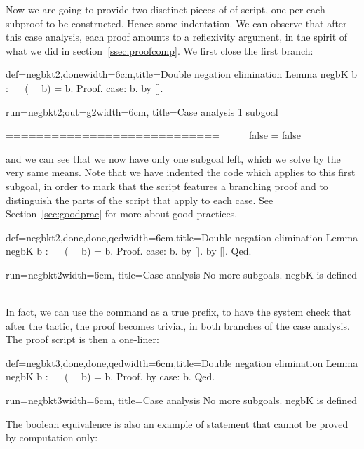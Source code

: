 Now we are going to provide two disctinct pieces of of script, one per
each subproof to be constructed. Hence some indentation. We can
observe that after this case analysis, each proof amounts to a
reflexivity argument, in the spirit of what we did in
section~\ref{ssec:proofcomp}. We first close the first branch:

\begin{coq}{def=negbkt2,done}{width=6cm,title=Double negation elimination}
Lemma negbK b : ~~ (~~ b) = b.
Proof.
case: b.
  by [].
\end{coq}
\begin{coqout}{run=negbkt2;out=g2}{width=6cm, title=Case analysis}
1 subgoal

 ============================
   ~~ ~~ false = false
\end{coqout}

and we can see that we now have only one subgoal left, which we solve
by the very same means. Note that we have indented the code which
applies to this first subgoal, in order to mark that the script
features a branching proof and to distinguish the parts of the script
that apply to each case. See Section~\ref{sec:goodprac} for more about good
practices.


\begin{coq}{def=negbkt2,done,done,qed}{width=6cm,title=Double negation elimination}
Lemma negbK b : ~~ (~~ b) = b.
Proof.
case: b.
  by [].
by [].
Qed.
\end{coq}
\begin{coqout}{run=negbkt2}{width=6cm, title=Case analysis}
No more subgoals.
negbK is defined
$~$
$~$
$~$
$~$
\end{coqout}

In fact, we can use the  command as a true prefix, to have the
system check that after the  tactic, the proof becomes
trivial, in both branches of the case analysis. The proof script is
then a one-liner:

\begin{coq}{def=negbkt3,done,done,qed}{width=6cm,title=Double negation elimination}
Lemma negbK b : ~~ (~~ b) = b.
Proof. by case: b. Qed.
\end{coq}
\begin{coqout}{run=negbkt3}{width=6cm, title=Case analysis}
No more subgoals.
negbK is defined
\end{coqout}

The boolean equivalence  is also an example of statement that
cannot be proved by computation only:

